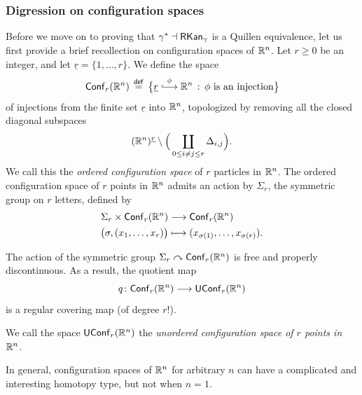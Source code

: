 \subsubsection{Digression on configuration spaces}

Before we move on to proving that $\gamma^* \dashv \operatorname{{\sf RKan}}_\gamma$ is a Quillen equivalence, let us first provide a brief recollection on configuration spaces of $\mathbb R^{n}$. Let $r \geq 0$ be an integer, and let $\underline{r} = \{1,\ldots,r\}$. We define the space
\begin{equation}
    \mathsf{Conf}_{r}(\RR^{n}) \,\overset{\sf def}{=}\, \big\{\underline{r} \xlonghookra{\phi} \RR^{n}\, : \, \phi \text{ is an injection} \big\}
\end{equation}
of injections from the finite set $\underline{r}$ into $\mathbb R^{n}$, topologized by removing all the closed diagonal subspaces 
\begin{equation}
    (\mathbb R^{n})^{\underline{r}} \setminus \Big(\coprod_{0\leq i\neq j\leq r} \Delta_{i,j}\Big).
\end{equation}
We call this the \emph{ordered configuration space} of $r$ particles in $\mathbb R^{n}$. The ordered configuration space of $r$ points in $\mathbb R^{n}$ admits an action by $\Sigma_r$, the symmetric group on $r$ letters, defined by
\begin{align}
 \Sigma_r \times \mathsf{Conf}_r(\mathbb R^{n}) &\longrightarrow \mathsf{Conf}_r(\mathbb R^{n}) \\
 \big(\sigma,(x_1,\ldots,x_r) \big) &\longmapsto (x_{\sigma(1)},\ldots, x_{\sigma(r)}).
\end{align}

\begin{lemma}
    The action of the symmetric group $\Sigma_r \curvearrowright \mathsf{Conf}_r(\mathbb R^{n})$ is free and properly discontinuous. As a result, the quotient map 
    \begin{equation}
        q \colon \mathsf{Conf}_{r}(\mathbb R^{n}) \longrightarrow \mathsf{UConf}_{r}(\mathbb R^{n})
    \end{equation} 
    is a regular covering map (of degree $r!$).
\end{lemma}

\begin{definition}
    We call the space $\mathsf{UConf}_{r}(\mathbb R^{n})$ the \emph{unordered configuration space of $r$ points in $\mathbb R^{n}$}.
\end{definition}

In general, configuration spaces of $\mathbb R^{n}$ for arbitrary $n$ can have a complicated and interesting homotopy type, but not when $n=1$.

